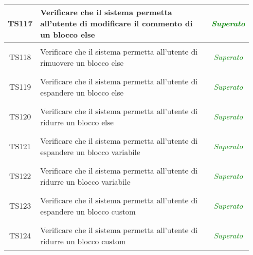 \begin{longtable}{|c|>{}m{8cm}|c|}
\hypertarget{TS4.33.1}{TS117} & Verificare che il sistema permetta all'utente di modificare il commento di un blocco else & \textcolor{Green}{\textit{Superato}}\\ \hline
\hypertarget{TS4.34}{TS118} & Verificare che il sistema permetta all'utente di rimuovere un blocco else & \textcolor{Green}{\textit{Superato}}\\ \hline
\hypertarget{TS4.35}{TS119} & Verificare che il sistema permetta all'utente di espandere un blocco else & \textcolor{Green}{\textit{Superato}}\\ \hline
\hypertarget{TS4.36}{TS120} & Verificare che il sistema permetta all'utente di ridurre un blocco else & \textcolor{Green}{\textit{Superato}}\\ \hline
\hypertarget{TS4.37}{TS121} & Verificare che il sistema permetta all'utente di espandere un blocco variabile & \textcolor{Green}{\textit{Superato}}\\ \hline
\hypertarget{TS4.38}{TS122} & Verificare che il sistema permetta all'utente di ridurre un blocco variabile & \textcolor{Green}{\textit{Superato}}\\ \hline
\hypertarget{TS4.39}{TS123} & Verificare che il sistema permetta all'utente di espandere un blocco custom & \textcolor{Green}{\textit{Superato}}\\ \hline
\hypertarget{TS4.40}{TS124} & Verificare che il sistema permetta all'utente di ridurre un blocco custom & \textcolor{Green}{\textit{Superato}}\\ \hline


\end{longtable}
